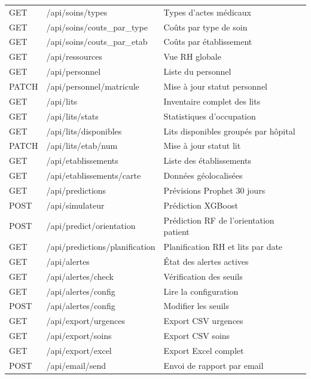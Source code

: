 \documentclass[12pt,a4paper]{report}
\begin{document}
\begin{longtable}{llp{6cm}}
		GET    & /api/soins/types              & Types d'actes médicaux \\
		GET    & /api/soins/couts\_par\_type   & Coûts par type de soin \\
		GET    & /api/soins/couts\_par\_etab   & Coûts par établissement \\
		GET    & /api/ressources               & Vue RH globale \\
		GET    & /api/personnel                & Liste du personnel \\
		PATCH  & /api/personnel/{matricule}    & Mise à jour statut personnel \\
		GET    & /api/lits                     & Inventaire complet des lits \\
		GET    & /api/lits/stats               & Statistiques d'occupation \\
		GET    & /api/lits/disponibles         & Lits disponibles groupés par hôpital \\
		PATCH  & /api/lits/{etab}/{num}        & Mise à jour statut lit \\
		GET    & /api/etablissements           & Liste des établissements \\
		GET    & /api/etablissements/carte     & Données géolocalisées \\
		GET    & /api/predictions              & Prévisions Prophet 30 jours \\
		POST   & /api/simulateur               & Prédiction XGBoost \\
		POST   & /api/predict/orientation      & Prédiction RF de l'orientation patient \\
		GET    & /api/predictions/planification & Planification RH et lits par date \\
		GET    & /api/alertes                  & État des alertes actives \\
		GET    & /api/alertes/check            & Vérification des seuils \\
		GET    & /api/alertes/config           & Lire la configuration \\
		POST   & /api/alertes/config           & Modifier les seuils \\
		GET    & /api/export/urgences          & Export CSV urgences \\
		GET    & /api/export/soins             & Export CSV soins \\
		GET    & /api/export/excel             & Export Excel complet \\
		POST   & /api/email/send               & Envoi de rapport par email \\

\end{longtable}
\end{document}
